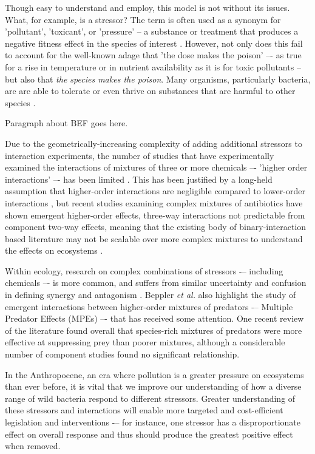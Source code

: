 \documentclass[final,1p,times]{elsarticle}
\begin{document}
Though easy to understand and employ, this model is not without its issues. What, for example, is a stressor? The term is often used as a synonym for 'pollutant', 'toxicant', or 'pressure' -- a substance or treatment that produces a negative fitness effect in the species of interest \cite{Piggott2015}. However, not only does this fail to account for the well-known adage that 'the dose makes the poison'\cite{OGParacelsus} –- as true for a rise in temperature or in nutrient availability as it is for toxic pollutants -- but also that \textit{the species makes the poison}. Many organisms, particularly bacteria, are are able to tolerate or even thrive on substances that are harmful to other species \cite{Malik2004,Gadd2009}. 

Paragraph about BEF goes here.

Due to the geometrically-increasing complexity of adding additional stressors to interaction experiments, the number of studies that have experimentally examined the interactions of mixtures of three or more chemicals –- 'higher order interactions' –- has been limited \cite{Beppler2016UncoveringStressors}. This has been justified by a long-held assumption that higher-order interactions are negligible compared to lower-order interactions \cite{Tekin2017PrevalenceInteractions}, but recent studies examining complex mixtures of antibiotics have shown emergent higher-order effects,  three-way interactions not predictable from component two-way effects, meaning that the existing body of binary-interaction based literature may not be scalable over more complex mixtures to understand the effects on ecosystems \cite{Tekin2016, Zimmer2016, Tekin2017}.

Within ecology, research on complex combinations of stressors -– including chemicals –- is more common, and suffers from similar uncertainty and confusion in defining synergy and antagonism \cite{Cote2016}.  Beppler \textit{et al.} also highlight the study of emergent interactions between higher-order mixtures of predators -– Multiple Predator Effects (MPEs) –- that has received some attention. One recent review of the literature \cite{Griffin2013EffectsMeta-analysis} found overall that species-rich mixtures of predators were more effective at suppressing prey than poorer mixtures, although a considerable number of component studies found no significant relationship. 

In the Anthropocene, an era where pollution is a greater pressure on ecosystems than ever before, it is vital that we improve our understanding of how a diverse range of wild bacteria respond to different stressors. Greater understanding of these stressors and interactions will enable more targeted and cost-efficient legislation and interventions -– for instance, one stressor has a disproportionate effect on overall response and thus should produce the greatest positive effect when removed. 
\end{document}
